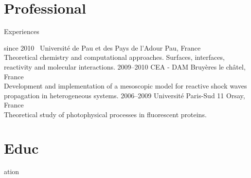 \documentclass{cv-style}     %
\begin{document}


\vspace{-2mm}
\section{Professional }{Experiences}
\vspace{-0.3cm}

\begin{entrylist}
\entry
  {since 2010~}
  {Université de Pau et des Pays de l'Adour}
  {Pau, France}
  {\\
   Theoretical chemistry and computational approaches.
   Surfaces, interfaces, reactivity and molecular interactions.}
\entry
  {2009--2010}
  {CEA - DAM}
  {Bruyères le châtel, France}
  {
  \\
  Development and implementation of a mesoscopic model for reactive shock waves
  propagation in heterogeneous systems.
  }
\entry
  {2006--2009}
  {Université Paris-Sud 11}
  {Orsay, France}
  {
  \\
  Theoretical study of photophysical processes in fluorescent proteins.
  }
\end{entrylist}

\vspace{-5mm}
\section{Educ}{ation}
\vspace{-0.2cm}
\end{document}
